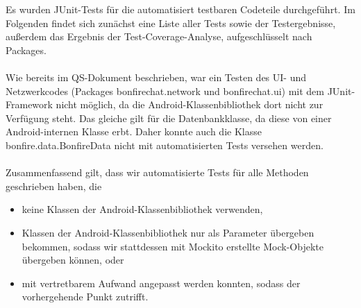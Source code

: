 Es wurden JUnit-Tests für die automatisiert testbaren Codeteile durchgeführt.
Im Folgenden findet sich zunächst eine Liste aller Tests sowie der Testergebnisse,
außerdem das Ergebnis der Test-Coverage-Analyse, aufgeschlüsselt nach Packages.
\\\\
Wie bereits im QS-Dokument beschrieben, war ein Testen des UI- und Netzwerkcodes
(Packages bonfirechat.network und bonfirechat.ui)
mit dem JUnit-Framework nicht möglich, da die Android-Klassenbibliothek dort nicht
zur Verfügung steht. Das gleiche gilt für die Datenbankklasse, da diese von einer
Android-internen Klasse erbt. Daher konnte auch die Klasse bonfire.data.BonfireData
nicht mit automatisierten Tests versehen werden.
\\\\
Zusammenfassend gilt, dass wir automatisierte Tests für alle Methoden geschrieben haben,
die
\begin{itemize}
\item keine Klassen der Android-Klassenbibliothek verwenden,
\item Klassen der Android-Klassenbibliothek nur als Parameter übergeben bekommen,
sodass wir stattdessen mit Mockito erstellte Mock-Objekte übergeben können, oder
\item mit vertretbarem Aufwand angepasst werden konnten, sodass der vorhergehende Punkt zutrifft.
\end{itemize}










